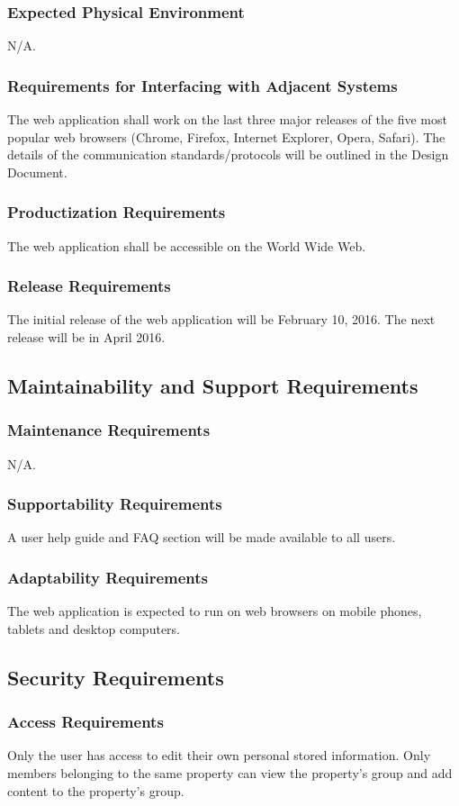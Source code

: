 \documentclass[12pt]{article}
\begin{document}
{{{{{{{\subsubsection{Expected Physical Environment}
N/A.
\subsubsection{Requirements for Interfacing with Adjacent Systems}
The web application shall work on the last three major releases of the five most 
popular web browsers (Chrome, Firefox, Internet Explorer, Opera, Safari). The details 
of the communication standards/protocols will be outlined in the Design Document.
\subsubsection{Productization Requirements}
The web application shall be accessible on the World Wide Web.
\subsubsection{Release Requirements}
The initial release of the web application will be February 10, 2016. The next 
release will be in April 2016.
\subsection{Maintainability and Support Requirements}
\subsubsection{Maintenance Requirements}
N/A.
\subsubsection{Supportability Requirements}
A user help guide and FAQ section will be made available to all users.
\subsubsection{Adaptability Requirements}
The web application is expected to run on web browsers on mobile phones, tablets 
and desktop computers.
\subsection{Security Requirements}
\subsubsection{Access Requirements}
Only the user has access to edit their own personal stored information. Only members belonging 
to the same property can view the property's group and add content to the 
property's group.
}}}}}}}
\end{document}
